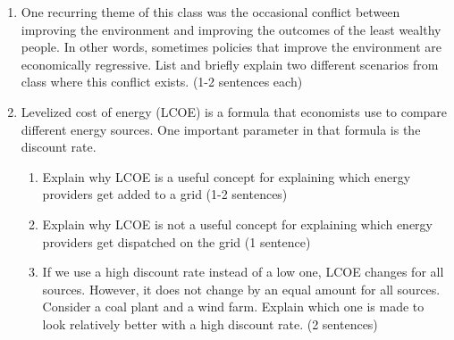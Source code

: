 \documentclass[11pt]{article}
\newcommand{\answer}[1]{\iftoggle{INCLUDEANSWERS}{{\color{violet!70!white}\textbf{Solution:} #1}}{} }
\newcommand{\points}[1]{\iftoggle{INCLUDEPOINTS}{{\color{blue!70!white}(#1 pts.)}}{}}
\begin{document}
\begin{enumerate}
  \item \points{10} One recurring theme of this class was the occasional conflict between improving the environment and improving the outcomes of the least wealthy people. In other words, sometimes policies that improve the environment are economically regressive. List and briefly explain two​ different scenarios from class where this conflict exists. (1-2 sentences each)
  
  \answer{Pretty open question, some examples: solar panel subsidies, electric vehicle subsidies, any sort of corrective tax where different people pay different amounts (e.g. gas tax)}
  
  \item \points{15} Levelized cost of energy (LCOE) is a formula that economists use to compare different energy sources. One important parameter in that formula is the discount rate.

  \begin{enumerate}
    \item Explain why LCOE is a useful concept for explaining which energy providers get added to a grid (1-2 sentences)
    \item Explain why LCOE is not a useful concept for explaining which energy providers get dispatched on the grid (1 sentence)
    \item If we use a high discount rate instead of a low one, LCOE changes for all sources. However, it does not change by an equal amount for all sources. Consider a coal plant and a wind farm. Explain which one is made to look relatively better with a high discount rate. (2 sentences)
  \end{enumerate}

  \answer{
    \begin{enumerate}
      \item When adding new sources of electricity to the grid, they chose the generator with the lowest average cost of producing electricity. Therefore this explains why solar and wind are being added in such large quantities
      \item The dispatch curve is the marginal cost of providing electricity and electricity is dispatched in order of lowest marginal cost. The LCOE tells us the average cost which is different (e.g. high fixed cost vs. low marginal cost)
      \item Coal plant will be appear better with a higher discount rate because the future marginal costs of operating the plan will seem relatively smaller with a higher discount rate. Wind's future marginal cost is near zero, so the LCOE does not depend largely on the discount rate.
    \end{enumerate}
  }


\end{enumerate}
\end{document}
